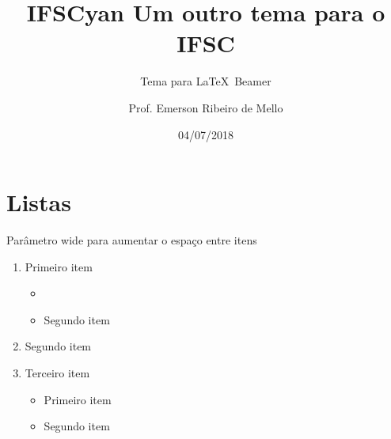 \documentclass{beamer}
\title{IFSCyan Um outro tema para o IFSC}
\subtitle{Tema para \LaTeX~Beamer}
\author{Prof. Emerson Ribeiro de Mello}
\institute{%
\href{mello@ifsc.edu.br}{mello@ifsc.edu.br}%
}%
\date{04/07/2018}
\begin{document}
\begin{frame}[plain]
	\titlepage
\end{frame}




\section{Listas}

\begin{frame}[wide]{Parâmetro wide para aumentar o espaço entre itens}
	\begin{enumerate}
		\item Primeiro item
		\begin{itemize}
			\item {}
			\item Segundo item
		\end{itemize}
		\item Segundo item
		\item Terceiro item 
		\begin{itemize}
			\item Primeiro item
			\item Segundo item
		\end{itemize}
	\end{enumerate}
\end{frame}
\end{document}
